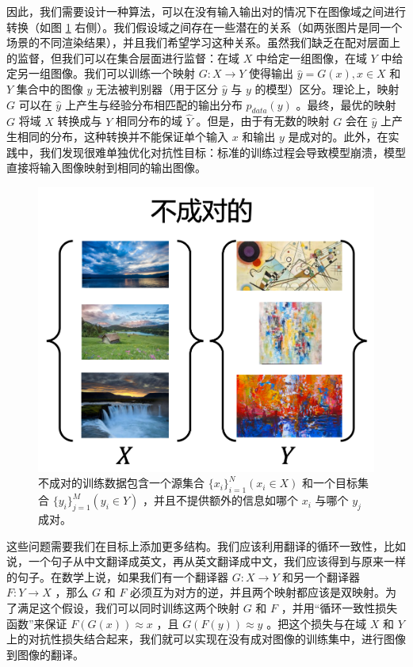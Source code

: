 \documentclass[conference]{IEEEtran}
\begin{document}
因此，我们需要设计一种算法，可以在没有输入输出对的情况下在图像域之间进行转换（如图 \ref{l2} 右侧）。我们假设域之间存在一些潜在的关系（如两张图片是同一个场景的不同渲染结果），并且我们希望学习这种关系。虽然我们缺乏在配对层面上的监督，但我们可以在集合层面进行监督：在域 $X$ 中给定一组图像，在域 $Y$ 中给定另一组图像。我们可以训练一个映射 $G: X \rightarrow Y$ 使得输出 $\hat{y} = G(x), x \in X$ 和 $Y$ 集合中的图像 $y$ 无法被判别器（用于区分 $\hat{y}$ 与 $y$ 的模型）区分。理论上，映射 $G$ 可以在 $\hat{y}$ 上产生与经验分布相匹配的输出分布 $p_{data}(y)$ 。最终，最优的映射 $G$ 将域 $X$ 转换成与 $Y$ 相同分布的域 $\hat{Y}$ 。但是，由于有无数的映射 $G$ 会在 $\hat{y}$ 上产生相同的分布，这种转换并不能保证单个输入 $x$ 和输出 $y$ 是成对的。此外，在实践中，我们发现很难单独优化对抗性目标：标准的训练过程会导致模型崩溃，模型直接将输入图像映射到相同的输出图像。

\begin{figure}
\centering
\includegraphics[scale=0.5]{img/2.png}
\caption{不成对的训练数据包含一个源集合 $\{x_i\}_{i=1}^{N}(x_i \in X)$ 和一个目标集合 $\{y_i\}_{j=1}^{M}(y_i \in Y)$ ，并且不提供额外的信息如哪个 $x_i$ 与哪个 $y_j$ 成对。}
\label{l2}
\end{figure}

这些问题需要我们在目标上添加更多结构。我们应该利用翻译的循环一致性，比如说，一个句子从中文翻译成英文，再从英文翻译成中文，我们应该得到与原来一样的句子。在数学上说，如果我们有一个翻译器 $G: X \rightarrow Y$ 和另一个翻译器 $F: Y \rightarrow X$ ，那么 $G$ 和 $F$ 必须互为对方的逆，并且两个映射都应该是双映射。为了满足这个假设，我们可以同时训练这两个映射 $G$ 和 $F$ ，并用“循环一致性损失函数”来保证 $F(G(x)) \approx x$ ，且 $G(F(y)) \approx y$ 。把这个损失与在域 $X$ 和 $Y$ 上的对抗性损失结合起来，我们就可以实现在没有成对图像的训练集中，进行图像到图像的翻译。
\end{document}

